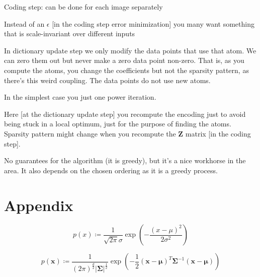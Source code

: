 \documentclass[12pt]{article}
\begin{document}
\ulb
\item Coding step: can be done for each image separately
\item Instead of an $\epsilon$ [in the coding step error minimization] you many want something that is scale-invariant over different inputs
\item In dictionary update step we only modify the data points that use that atom. We can zero them out but never make a zero data point non-zero. That is, as you compute the atoms, you change the coefficients but not the sparsity pattern, as there's this weird coupling. The data points do not use new atoms.
\item In the simplest case you just one power iteration.
\item Here [at the dictionary update step] you recompute the encoding just to avoid being stuck in a local optimum, just for the purpose of finding the atoms. Sparsity pattern might change when you recompute the $\mathbf{Z}$ matrix [in the coding step].
\item No guarantees for the algorithm (it is greedy), but it's a nice workhorse in the area. It also depends on the chosen ordering as it is a greedy process.
\ule

\section{Appendix}
\ulb
\item \[ p(x) \coloneqq \frac{1}{\sqrt{2\pi}\sigma}\exp\left( -\frac{(x-\mu)^2}{2\sigma^2} \right) \]
\item \[ p(\mathbf{x}) \coloneqq \frac{1}{(2\pi)^{\frac{d}{2}} |\mathbf{\Sigma}|^{\frac{1}{2}}} \exp\left( -\frac{1}{2} (\mathbf{x-\mu})^T\mathbf{\Sigma}^{-1}(\mathbf{x-\mu}) \right) \]
\ule
\end{document}
